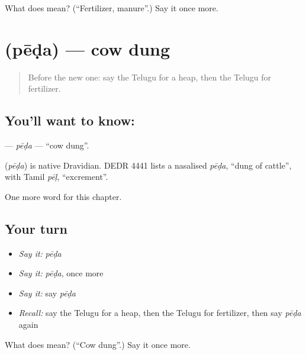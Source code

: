 \begin{tcolorbox}[breakable,colback=teal!4,colframe=teal!35!black,title={Before you move on}]
What does  mean? (\textquotedblleft{}Fertilizer, manure\textquotedblright{}.) Say it once more.
\end{tcolorbox}
\section[\texorpdfstring{\te{పేడ} (pēḍa)}{పేడ (pēḍa)}]{ (pēḍa) — cow dung}

\label{lesson:TE-C234-peda}



\begin{quote}
Before the new one: say the Telugu for a heap, then the Telugu for fertilizer.
\end{quote}

\subsection*{You'll want to know: }
\textbf{} — \emph{pēḍa} — \textquotedblleft{}cow dung\textquotedblright{}.

\begin{cousinweb}
\textbf{} (\emph{pēḍa}) is native Dravidian. DEDR 4441 lists a nasalised \emph{pēḍa}, \textquotedblleft{}dung of cattle\textquotedblright{}, with Tamil \emph{pēḷ}, \textquotedblleft{}excrement\textquotedblright{}.
\end{cousinweb}

\begin{grammarlens}[title={What you've built}]
One more word for this chapter.
\end{grammarlens}

\subsection*{Your turn}
\begin{itemize}
\raggedright
  \item \emph{Say it:} \emph{pēḍa}
  \item \emph{Say it:} \emph{pēḍa}, once more
  \item \emph{Say it:} say \emph{pēḍa}
  \item \emph{Recall:} say the Telugu for a heap, then the Telugu for fertilizer, then say \emph{pēḍa} again
\end{itemize}

\begin{tcolorbox}[breakable,colback=teal!4,colframe=teal!35!black,title={Before you move on}]
What does  mean? (\textquotedblleft{}Cow dung\textquotedblright{}.) Say it once more.
\end{tcolorbox}
